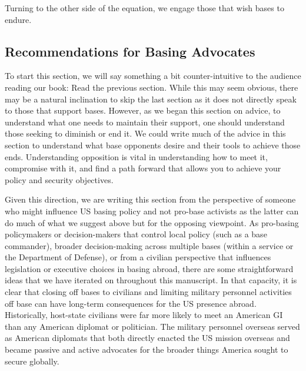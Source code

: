 Turning to the other side of the equation, we engage those that wish bases to endure. 

\subsection*{Recommendations for Basing Advocates} %

To start this section, we will say something a bit counter-intuitive to the audience reading our book: Read the previous section. While this may seem obvious, there may be a natural inclination to skip the last section as it does not directly speak to those that support bases. However, as we began this section on advice, to understand what one needs to maintain their support, one should understand those seeking to diminish or end it. We could write much of the advice in this section to understand what base opponents desire and their tools to achieve those ends. Understanding opposition is vital in understanding how to meet it, compromise with it, and find a path forward that allows you to achieve your policy and security objectives. 

Given this direction, we are writing this section from the perspective of someone who might influence US basing policy and not pro-base activists as the latter can do much of what we suggest above but for the opposing viewpoint. As pro-basing policymakers or decision-makers that control local policy (such as a base commander), broader decision-making across multiple bases (within a service or the Department of Defense), or from a civilian perspective that influences legislation or executive choices in basing abroad, there are some straightforward ideas that we have iterated on throughout this manuscript. In that capacity, it is clear that closing off bases to civilians and limiting military personnel activities off base can have long-term consequences for the US presence abroad. Historically, host-state civilians were far more likely to meet an American GI than any American diplomat or politician. The military personnel overseas served as American diplomats that both directly enacted the US mission overseas and became passive and active advocates for the broader things America sought to secure globally. 

